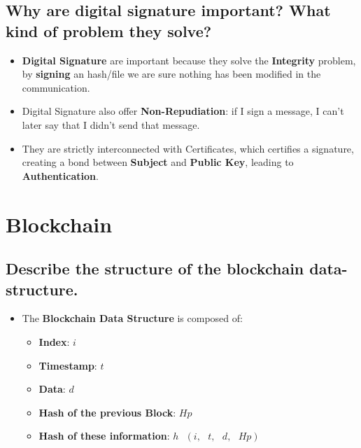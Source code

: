 \documentclass[9pt, letterpaper]{article}
\begin{document}
\subsection{Why are digital signature important? What kind of problem they solve?}
\begin{itemize}
	\item \textbf{Digital Signature} are important because they solve the \textbf{Integrity} problem, by \textbf{signing} an hash/file we are sure nothing has been modified in the communication.
	\item Digital Signature also offer \textbf{Non-Repudiation}: if I sign a message, I can't later say that I didn't send that message.
	\item They are strictly interconnected with Certificates, which certifies a signature, creating a bond between \textbf{Subject} and \textbf{Public Key}, leading to \textbf{Authentication}.
\end{itemize}






\section{Blockchain}

\subsection{Describe the structure of the blockchain data-structure.}
\begin{itemize}
	\item The \textbf{Blockchain Data Structure} is composed of:
	\begin{itemize}
		\item \textbf{Index}: $i$
		\item \textbf{Timestamp}: $t$
		\item \textbf{Data}: $d$
		\item \textbf{Hash of the previous Block}: $Hp$
		\item \textbf{Hash of these information}: $h \mbox{ } (i,\mbox{ } t,\mbox{  } d,\mbox{  } Hp)$
	\end{itemize}
\end{itemize}
\end{document}
